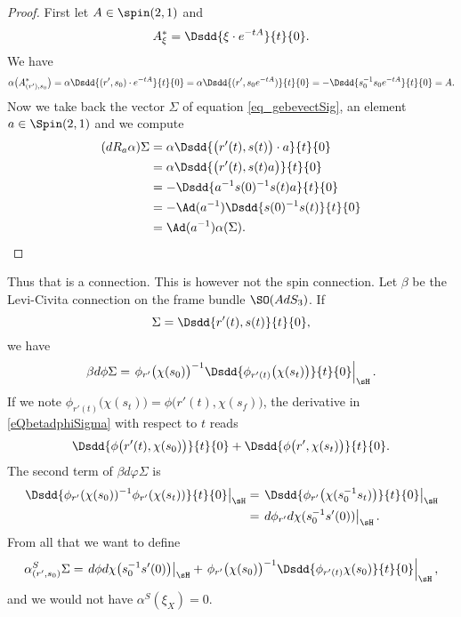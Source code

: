 \begin{proof}
	First let $A\in\spin(2,1)$ and
	\[
		A^*_{\xi}=\Dsdd{ \xi\cdot e^{-tA} }{t}{0}.
	\]
	We have
	\[
		\alpha\big( A^*_{(r'),s_{0}} \big)=\alpha \Dsdd{ (r',s_{0})\cdot e^{-tA}  }{t}{0}
		=\alpha\Dsdd{ (r',s_{0} e^{-tA}) }{t}{0}
		=-\Dsdd{ s_{0}^{-1}s_{0} e^{-tA}} {t}{0}
		=A.
	\]
	Now we take back the vector $\Sigma$ of equation \eqref{eq_gebevectSig}, an element $a\in\Spin(2,1)$ and we compute
	\[
		\begin{split}
			(dR_{a}\alpha)\Sigma&=\alpha\Dsdd{ \big( r'(t),s(t) \big)\cdot a }{t}{0}\\
			&=\alpha\Dsdd{ \big( r'(t),s(t)a \big) }{t}{0}\\
			&=-\Dsdd{ a^{-1}s(0)^{-1}s(t)a }{t}{0}\\
			&=-\Ad(a^{-1})\Dsdd{ s(0)^{-1}s(t) }{t}{0}\\
			&=\Ad(a^{-1})\alpha(\Sigma).
		\end{split}
	\]

\end{proof}
Thus that is a connection. This is however not the spin connection. Let $\beta$ be the Levi-Civita connection on the frame bundle $\SO(AdS_3)$. If
\[
	\Sigma=\Dsdd{ r'(t),s(t) }{t}{0},
\]
we have
\begin{equation} \label{eQbetadphiSigma}
	\beta d\phi\Sigma=\left. \phi_{r'}\big( \chi(s_{0}) \big)^{-1}\Dsdd{ \phi_{r'(t)}\big( \chi(s_{t}) \big) }{t}{0}\right|_{\sH}.
\end{equation}
If we note $\phi_{r'(t)}\big( \chi(s_{t}) \big)=\phi\big( r'(t),\chi(s_{f}) \big)$, the derivative in \eqref{eQbetadphiSigma} with respect to $t$ reads
\begin{equation}
	\Dsdd{ \phi\big( r'(t),\chi(s_{0}) \big) }{t}{0}+\Dsdd{ \phi\big( r',\chi(s_{t}) \big) }{t}{0}.
\end{equation}
The second term of $\beta d\varphi\Sigma$ is
\begin{align*}
	\left. \Dsdd{ \phi_{r'}(\chi(s_{0}))^{-1}\phi_{r'}(\chi(s_{t})) }{t}{0}\right|_{\sH}
	 & =\left. \Dsdd{ \phi_{r'}\big( \chi(s_{0}^{-1}s_{t}) \big) }{t}{0}\right|_{\sH} \\
	 & =\left. d\phi_{r'}d\chi(s_{0}^{-1}s'(0))\right|_{\sH}.
\end{align*}
From all that we want to define
\begin{equation}
	\alpha^{S}_{(r',s_{0})}\Sigma=\left.d\phi d\chi\big(s_{0}^{-1}s'(0)\big)\right|_{\sH}+\left.\phi_{r'}\big( \chi(s_{0}) \big)^{-1}\Dsdd{ \phi_{r'(t)}\chi(s_{0}) }{t}{0}\right|_{\sH},
\end{equation}
and we would not have $\alpha^{S}(\xi_{X})=0$.


